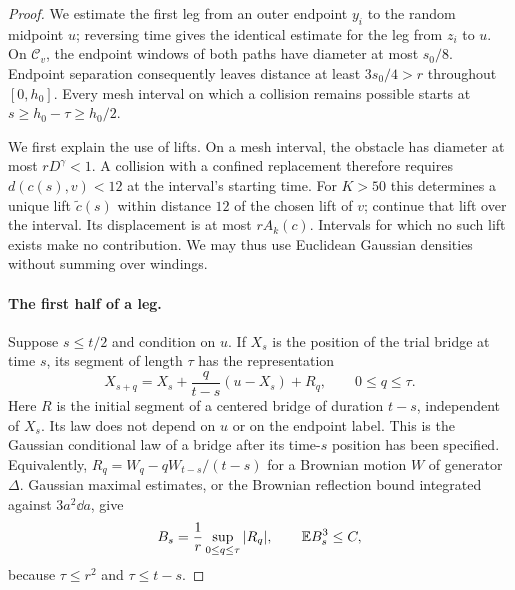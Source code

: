 \begin{proof}
We estimate the first leg from an outer endpoint $y_i$ to the random
midpoint $u$; reversing time gives the identical estimate for the leg
from $z_i$ to $u$.  On $\mathcal C_v$, the endpoint windows of both
paths have diameter at most $s_0/8$.  Endpoint separation consequently
leaves distance at least $3s_0/4>r$ throughout $[0,h_0]$.
Every mesh interval on which a collision remains possible starts at
$s\ge h_0-\tau\ge h_0/2$.

We first explain the use of lifts.  On a mesh interval, the obstacle has
diameter at most $rD^\gamma<1$.  A collision with a confined replacement
therefore requires $d(c(s),v)<12$ at the interval's starting time.  For
$K>50$ this determines a unique lift $\widetilde c(s)$ within distance
$12$ of the chosen lift of $v$; continue that lift over the interval.
Its displacement is at most $rA_k(c)$.  Intervals for which no such lift
exists make no contribution.  We may thus use Euclidean Gaussian
densities without summing over windings.

\paragraph{The first half of a leg.}
Suppose $s\le t/2$ and condition on $u$.  If $X_s$ is the position of
the trial bridge at time $s$, its segment of length $\tau$ has the
representation
\begin{equation}\label{bridge:markov-segment}
 X_{s+q}=X_s+\frac{q}{t-s}(u-X_s)+R_q,
 \qquad 0\le q\le\tau.
\end{equation}
Here $R$ is the initial segment of a centered bridge of duration $t-s$,
independent of $X_s$.  Its law does not depend on $u$ or on the endpoint
label.  This is the Gaussian conditional law of a bridge after its
time-$s$ position has been specified.  Equivalently,
$R_q=W_q-qW_{t-s}/(t-s)$ for a Brownian motion $W$ of generator $\Delta$.
Gaussian maximal estimates, or the Brownian reflection bound integrated
against $3a^2\dd a$, give
\begin{equation}\label{bridge:noise-moment}
 B_s=\frac1r\sup_{0\le q\le\tau}|R_q|,
 \qquad \mathbb E B_s^3\le C,
\end{equation}
because $\tau\le r^2$ and $\tau\le t-s$.


\end{proof}
